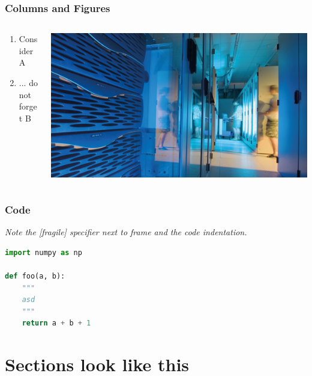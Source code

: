 \documentclass[aspectratio=1610]{beamer}
\begin{document}
\begin{frame}
    \frametitle{Columns and Figures}

    \begin{columns}
        \begin{column}{0.4\textwidth}
            \begin{enumerate}
                \item Consider A
                \item ... do not forget B
            \end{enumerate}
        \end{column}
        \begin{column}{0.4\textwidth}
            \centering
            \includegraphics[width=\textwidth]{logos/hgf_key_technologies.jpg}
        \end{column}
    \end{columns}
\end{frame}

\begin{frame}[fragile]
    \frametitle{Code}
    
    \emph{Note the [fragile] specifier next to frame and the code indentation.}
    
\begin{lstlisting}[language=Python]
import numpy as np

def foo(a, b):
    """
    asd
    """
    return a + b + 1
\end{lstlisting}
\end{frame}

\section{Sections look like this}
\end{document}
